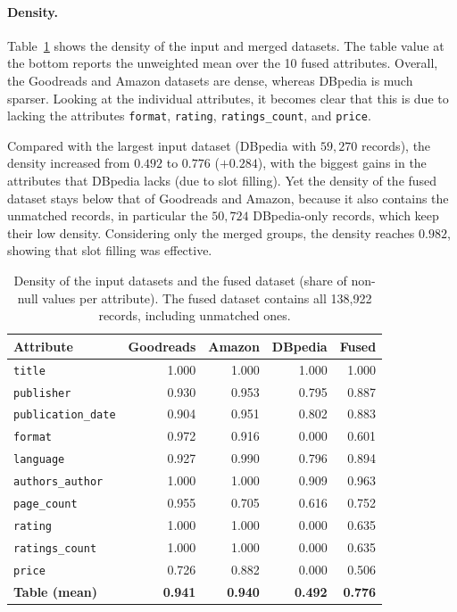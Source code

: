\documentclass[runningheads]{llncs}
\begin{document}
\paragraph{Density.}
Table~\ref{tab:density} shows the density of the input and merged datasets. The table value at the bottom reports the unweighted mean over the 10 fused attributes. Overall, the Goodreads and Amazon datasets are dense, whereas DBpedia is much sparser. Looking at the individual attributes, it becomes clear that this is due to lacking the attributes \texttt{format}, \texttt{rating}, \texttt{ratings\_count}, and \texttt{price}.

Compared with the largest input dataset (DBpedia with $59,270$ records), the density increased from $0.492$ to $0.776$ ($+0.284$), with the biggest gains in the attributes that DBpedia lacks (due to slot filling).
Yet the density of the fused dataset stays below that of Goodreads and Amazon, because it also contains the unmatched records, in particular the $50,724$ DBpedia-only records, which keep their low density. Considering only the merged groups, the density reaches $0.982$, showing that slot filling was effective.

\begin{table}[h]
\caption{Density of the input datasets and the fused dataset (share of non-null values per attribute). The fused dataset contains all 138,922 records, including unmatched ones.}
\label{tab:density}
\centering
\small
\setlength{\tabcolsep}{6pt}
\begin{tabular}{lrrrr}
\toprule
Attribute & Goodreads & Amazon & DBpedia & Fused \\
\midrule
\texttt{title}            & 1.000 & 1.000 & 1.000 & 1.000 \\
\texttt{publisher}        & 0.930 & 0.953 & 0.795 & 0.887 \\
\texttt{publication\_date} & 0.904 & 0.951 & 0.802 & 0.883 \\
\texttt{format}           & 0.972 & 0.916 & 0.000 & 0.601 \\
\texttt{language}         & 0.927 & 0.990 & 0.796 & 0.894 \\
\texttt{authors\_author}   & 1.000 & 1.000 & 0.909 & 0.963 \\
\texttt{page\_count}       & 0.955 & 0.705 & 0.616 & 0.752 \\
\texttt{rating}           & 1.000 & 1.000 & 0.000 & 0.635 \\
\texttt{ratings\_count}    & 1.000 & 1.000 & 0.000 & 0.635 \\
\texttt{price}            & 0.726 & 0.882 & 0.000 & 0.506 \\
\midrule
\textbf{Table (mean)}     & \textbf{0.941} & \textbf{0.940} & \textbf{0.492} & \textbf{0.776} \\
\bottomrule
\end{tabular}
\end{table}
\end{document}
